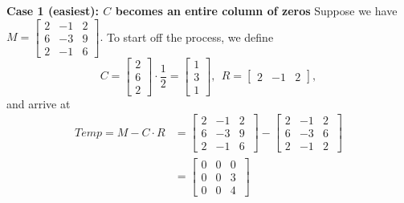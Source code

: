 \textbf{Case 1 (easiest): $C$ becomes an entire column of zeros}
Suppose we have $M=\left[ \begin{array}{rrr} 2 & -1 & 2\\
 6 & -3& 9 \\ 2 & -1 & 6  \end{array} \right].$ To start off the process, we define $$C=  \left[\begin{array}{r} 2 \\ 6 \\ 2 \end{array} \right] \cdot \frac{1}{2} =\left[\begin{array}{r} 1 \\ 3 \\ 1 \end{array} \right] ,~~R=\left[\begin{array}{rrr} 2 & -1 & 2 \end{array} \right], $$
and arrive at 
\begin{align*}
    Temp=M-C \cdot R &  =  \left[ \begin{array}{rrr} 2 & -1 & 2\\
 6 & -3& 9 \\ 2 & -1 & 6  \end{array}\ \right] -  \left[ \begin{array}{rrr} 2 & -1 & 2\\
 6 & -3& 6 \\ 2 & -1 & 2  \end{array}\ \right]\\
 &=  \left[ \begin{array}{rrr} 0 & 0 & 0\\
 0 & 0& 3 \\0 &0 & 4  \end{array}\ \right]
\end{align*}

